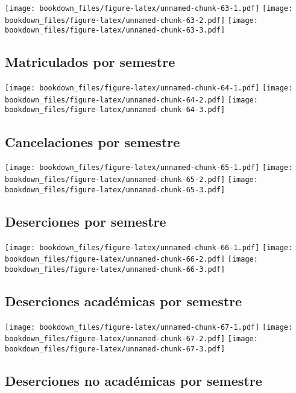 \documentclass[]{article}
\theoremstyle{definition}
\theoremstyle{definition}
\theoremstyle{definition}
\theoremstyle{remark}
\begin{document}
\texttt{[image: bookdown\_files/figure-latex/unnamed-chunk-63-1.pdf]}
\texttt{[image: bookdown\_files/figure-latex/unnamed-chunk-63-2.pdf]}
\texttt{[image: bookdown\_files/figure-latex/unnamed-chunk-63-3.pdf]}

\subsection{Matriculados por semestre}\label{matriculados-por-semestre}

\texttt{[image: bookdown\_files/figure-latex/unnamed-chunk-64-1.pdf]}
\texttt{[image: bookdown\_files/figure-latex/unnamed-chunk-64-2.pdf]}
\texttt{[image: bookdown\_files/figure-latex/unnamed-chunk-64-3.pdf]}

\subsection{Cancelaciones por
semestre}\label{cancelaciones-por-semestre}

\texttt{[image: bookdown\_files/figure-latex/unnamed-chunk-65-1.pdf]}
\texttt{[image: bookdown\_files/figure-latex/unnamed-chunk-65-2.pdf]}
\texttt{[image: bookdown\_files/figure-latex/unnamed-chunk-65-3.pdf]}

\subsection{Deserciones por semestre}\label{deserciones-por-semestre}

\texttt{[image: bookdown\_files/figure-latex/unnamed-chunk-66-1.pdf]}
\texttt{[image: bookdown\_files/figure-latex/unnamed-chunk-66-2.pdf]}
\texttt{[image: bookdown\_files/figure-latex/unnamed-chunk-66-3.pdf]}

\subsection{Deserciones académicas por
semestre}\label{deserciones-academicas-por-semestre}

\texttt{[image: bookdown\_files/figure-latex/unnamed-chunk-67-1.pdf]}
\texttt{[image: bookdown\_files/figure-latex/unnamed-chunk-67-2.pdf]}
\texttt{[image: bookdown\_files/figure-latex/unnamed-chunk-67-3.pdf]}

\subsection{Deserciones no académicas por
semestre}\label{deserciones-no-academicas-por-semestre}
\end{document}
